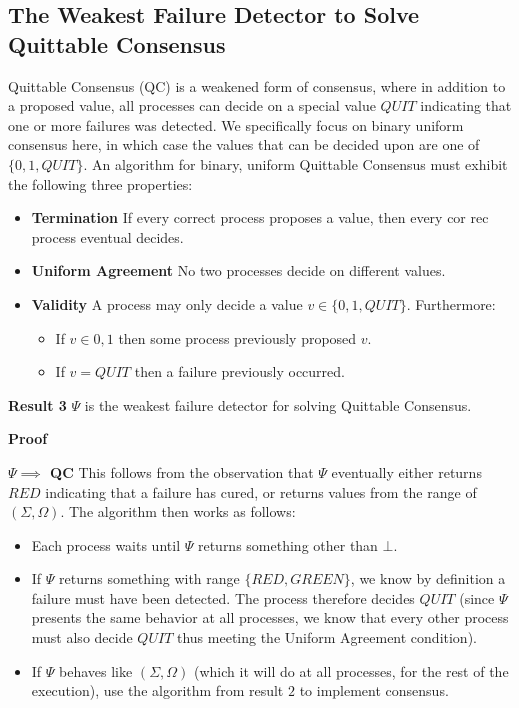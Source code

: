\subsection{The Weakest Failure Detector to Solve Quittable Consensus}
Quittable Consensus (QC) is a weakened form of consensus, where in addition to a proposed value, all processes can decide on
a special value $QUIT$ indicating that one or more failures was detected. We specifically focus on binary uniform
consensus here, in which case the values that can be decided upon are one of $\{0, 1, QUIT\}$. An algorithm for binary,
uniform Quittable Consensus must exhibit the following three properties:
\begin{itemize}
\item \textbf{Termination} If every correct process proposes a value, then every cor rec process eventual decides.
\item \textbf{Uniform Agreement} No two processes decide on different values.
\item \textbf{Validity} A process may only decide a value $v\in \{0, 1, QUIT\}$. Furthermore:
\begin{itemize}
\item If $v\in {0, 1}$ then some process previously proposed $v$.
\item If $v = QUIT$ then a failure previously occurred.
\end{itemize}
\end{itemize}
\textbf{Result 3} $\Psi$ is the weakest failure detector for solving Quittable Consensus.

\textbf{Proof}

\textbf{$\Psi \implies$ QC} This follows from the observation that $\Psi$ eventually either returns $RED$ indicating
that a failure has cured, or returns values from the range of $(\Sigma, \Omega)$. The algorithm then works as follows:
\begin{itemize}
\item Each process waits until $\Psi$ returns something other than $\bot$.
\item If $\Psi$ returns something with range $\{RED, GREEN\}$, we know by definition a failure must have been detected.
The process therefore decides $QUIT$ (since $\Psi$ presents the same behavior at all processes, we know that every other
process must also decide $QUIT$ thus meeting the Uniform Agreement condition).
\item If $\Psi$ behaves like $(\Sigma, \Omega)$ (which it will do at all processes, for the rest of the execution), use
the algorithm from result $2$ to implement consensus.
\end{itemize}

